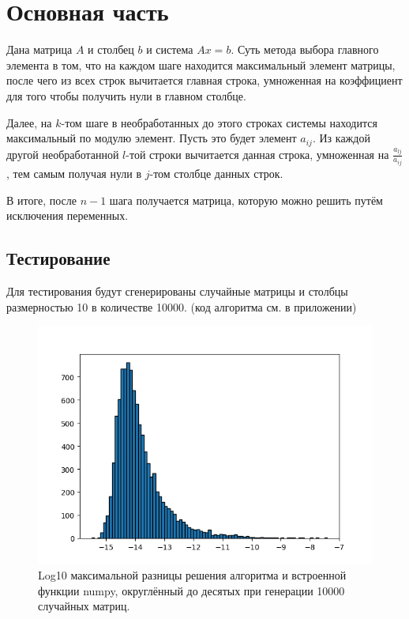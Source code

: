 \section{Основная часть}
Дана матрица $A$ и столбец $b$ и система $Ax = b$. Суть метода выбора главного элемента в том, что на каждом шаге находится максимальный элемент матрицы, после чего из всех строк вычитается главная строка, умноженная на коэффициент для того чтобы получить нули в главном столбце. 
    
Далее, на $k$-том шаге в необработанных до этого строках системы находится максимальный по модулю элемент. Пусть это будет элемент $a_{ij}$. Из каждой другой необработанной $l$-той строки вычитается данная строка, умноженная на $\frac{a_{lj}}{a_{ij}}$, тем самым получая нули в $j$-том столбце данных строк.

В итоге, после $n-1$ шага получается матрица, которую можно решить путём исключения переменных.

\pagebreak

\subsection{Тестирование}
Для тестирования будут сгенерированы случайные матрицы и столбцы размерностью 10 в количестве 10000. (код алгоритма см. в приложении)

\begin{figure}[H]
    \centering
    \includegraphics[width=16cm]{pictures/BarCounts.png}
    \caption{Log10 максимальной разницы решения алгоритма и встроенной функции numpy, округлённый до десятых при генерации 10000 случайных матриц.}
\end{figure}


